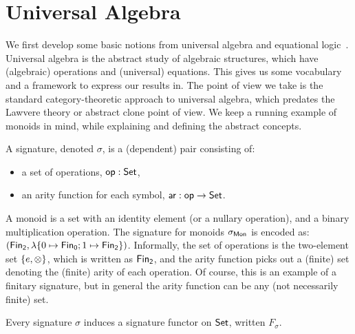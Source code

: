 \section{Universal Algebra}
\label{sec:universal-algebra}

We first develop some basic notions from universal algebra and equational
logic~\cite{birkhoffStructureAbstractAlgebras1935}.
%
Universal algebra is the abstract study of algebraic structures, which have (algebraic) operations and (universal)
equations.
%
This gives us some vocabulary and a framework to express our results in.
%
The point of view we take is the standard category-theoretic approach to universal algebra, which predates the Lawvere
theory or abstract clone point of view.
%
We keep a running example of monoids in mind, while explaining and defining the abstract concepts.

\begin{definition}[Signature]
    A signature, denoted $\sigma$, is a (dependent) pair consisting of:
    \begin{itemize}
        \item a set of operations, $\operatorname{\mathsf{op}} : \mathsf{Set}$,
        \item an arity function for each symbol, $\operatorname{\mathsf{ar}} : \operatorname{\mathsf{op}} \to \mathsf{Set}$.
    \end{itemize}
\end{definition}

\begin{example}
    A monoid is a set with an identity element (or a nullary operation), and a binary multiplication operation.
    The signature for monoids $\sigma_{\mathsf{Mon}}$ is encoded as:
    $(\Fin[2],\lambda \{0 \mapsto \Fin[0] ; 1 \mapsto \Fin[2] \})$.
    Informally, the set of operations is the two-element set $\{e,\otimes\}$, which is written as $\Fin[2]$,
    and the arity function picks out a (finite) set denoting the (finite) arity of each operation.
    Of course, this is an example of a finitary signature,
    but in general the arity function can be any (not necessarily finite) set.
\end{example}

Every signature $\sigma$ induces a signature functor on $\mathsf{Set}$, written $F_{\sigma}$.

